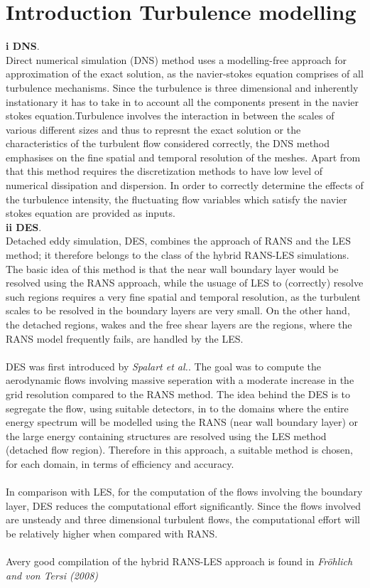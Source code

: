 \newpage

\section{Introduction Turbulence modelling}

{\bf i DNS}.\\
Direct numerical simulation (DNS) method uses a modelling-free approach for approximation of the exact solution, as the navier-stokes equation comprises of all turbulence mechanisms. Since the turbulence is three dimensional and inherently instationary it has to take in to account all the components present in the navier stokes equation.Turbulence involves the interaction in between the scales of various different sizes and thus to represnt the exact solution or the characteristics of the turbulent flow considered correctly, the DNS method emphasises on the fine spatial and temporal resolution of the meshes. Apart from that this method requires the discretization methods to have low level of numerical dissipation and dispersion. In order to correctly determine the effects of the turbulence intensity, the fluctuating flow variables which satisfy the navier stokes equation are provided as inputs.
\\
{\bf ii DES}.\\
Detached eddy simulation, DES, combines the approach of RANS and the LES method; it therefore belongs to the class of the hybrid RANS-LES simulations. The basic idea of this method is that the near wall boundary layer would be resolved using the RANS approach, while the usuage of LES to (correctly) resolve such regions requires a very fine spatial and temporal resolution, as the turbulent scales to be resolved in the boundary layers are very small. On the other hand, the detached regions, wakes and the free shear layers are the regions, where the RANS model frequently fails, are handled by the LES.\\
\\
 DES was first introduced by {\it Spalart et al.}. The goal was to compute the aerodynamic flows involving massive seperation with a moderate increase in the grid resolution compared to the RANS method. The idea behind the DES is to segregate the flow, using suitable detectors, in to the domains where the entire energy spectrum will be modelled using the RANS (near wall boundary layer) or the large energy containing structures are resolved using the LES method (detached flow region). Therefore in this approach, a suitable method is chosen, for each domain, in terms of efficiency and accuracy.\\
\\
In comparison with LES, for the computation of the flows involving the boundary layer, DES reduces the computational effort significantly. Since the flows involved are unsteady and three dimensional turbulent flows, the computational effort will be relatively higher when compared with RANS.\\
\\
Avery good compilation of the hybrid RANS-LES approach is found in {\it Fröhlich and von Tersi (2008)}\\


